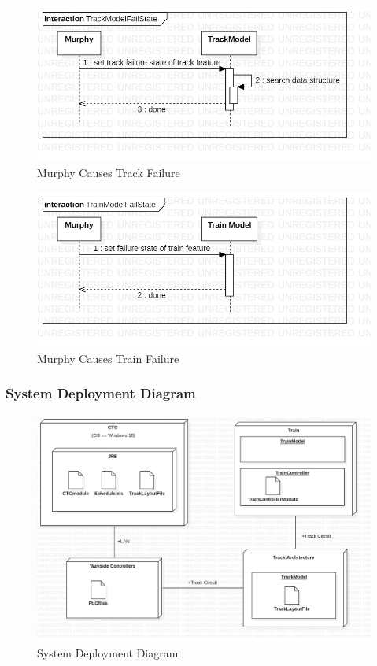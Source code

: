 \documentclass{article}
\begin{document}
    \begin{figure}[H]
        \centering
        \includegraphics[width=\textwidth]{./System/Sequence/TrackModelFailState_SeqDiagram.png}
        \caption{Murphy Causes Track Failure}
        \label{fig:Murphy Causes Track Failure}
    \end{figure}
    
    \begin{figure}[H]
        \centering
        \includegraphics[width=\textwidth]{./System/Sequence/TrainModelFailState_SeqDiagram.png}
        \caption{Murphy Causes Train Failure}
        \label{fig:Murphy Causes Train Failure}
    \end{figure}
    
    \subsubsection{System Deployment Diagram}
    \begin{figure}[H]
        \centering
        \includegraphics[width=\textwidth]{./System/DeploymentDiagram.png}
        \caption{System Deployment Diagram}
        \label{fig:deployment_diagram}
    \end{figure}
\end{document}
